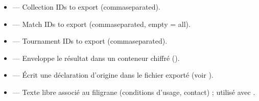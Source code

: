 \documentclass[letterpaper,10pt,english]{sphinxmanual}
\begin{document}
\begin{itemize}
\item {} 
\sphinxAtStartPar
{} — Collection IDs to export (comma\sphinxhyphen{}separated).

\item {} 
\sphinxAtStartPar
{} — Match IDs to export (comma\sphinxhyphen{}separated, empty = all).

\item {} 
\sphinxAtStartPar
{} — Tournament IDs to export (comma\sphinxhyphen{}separated).

\item {} 
\sphinxAtStartPar
{} — Enveloppe le résultat dans un conteneur chiffré ().

\item {} 
\sphinxAtStartPar
{} — Écrit une déclaration d’origine  dans le fichier
exporté (voir {\hyperref[\detokenize{manuel:diffusion-controlee}]{}}).

\item {} 
\sphinxAtStartPar
{} — Texte libre associé au filigrane (conditions
d’usage, contact) ; utilisé avec .

\end{itemize}

\sphinxAtStartPar
{}
\end{document}
